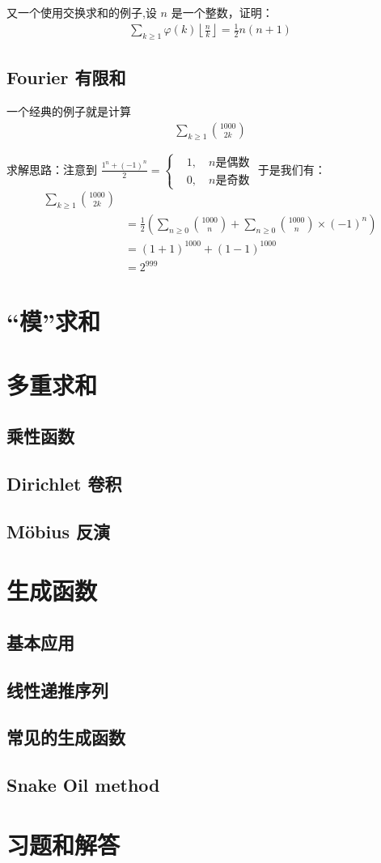 \documentclass[12pt]{article}
\begin{document}
又一个使用交换求和的例子,设  $n$ 是一个整数，证明：
\begin{align*}
    \sum_{k\ge 1}^{}{\varphi(k)\left\lfloor\frac{n}{k}\right\rfloor} = \frac12n(n+1)
\end{align*}

\subsection{Fourier 有限和}
一个经典的例子就是计算
\begin{align*}
    \sum_{k\ge 1}^{}{\binom{1000}{2k}}
\end{align*}

求解思路：注意到 
$\displaystyle \frac{1^n+(-1)^n}{2} = \left\{\begin{aligned} & 1,\quad n\mbox{是偶数}\\ & 0,\quad  n\mbox{是奇数}\end{aligned}\right.$
于是我们有：
\begin{align*}
    \sum_{k\ge 1}^{}{\binom{1000}{2k}} \\
    & = \frac12 \left(\sum_{n\ge 0}^{}{\binom{1000}{n}} + \sum_{n\ge 0}^{}{\binom{1000}{n}}\times (-1)^n\right)\\
    & = (1+1)^{1000} + (1-1)^{1000}\\
    & = 2^{999}
\end{align*}


\section{``模''求和}
\section{多重求和}
\subsection{乘性函数}
\subsection{Dirichlet 卷积}
\subsection{M\"obius 反演}



\section{生成函数}
\subsection{基本应用}
\subsection{线性递推序列}
\subsection{常见的生成函数}
\subsection{Snake Oil method}

\section{习题和解答}
\end{document}
